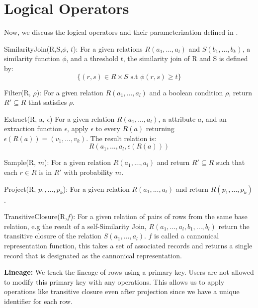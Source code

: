\section{Logical Operators}
Now, we discuss the logical operators and their parameterization defined in \projx.

\vspace{0.5em}

\noindent \textsf{SimilarityJoin(R,S,$\phi$, $t$)}: For a given relations $R(a_1,...,a_l)$ and $S(b_1,...,b_k)$, a similarity function $\phi$, and a threshold $t$, the similarity join of R and S is defined by:
\[
\{ (r,s) \in R \times S \text{ s.t } \phi (r,s) \ge t \}
\]

\vspace{0.5em}


\noindent \textsf{Filter(R, $\rho$)}: For a given relation $R(a_1,...,a_l)$ and a boolean condition $\rho$, return $R' \subseteq R$ that satisfies $\rho$.

\vspace{0.5em}

\noindent \textsf{Extract(R, a, $\epsilon$)} For a given relation $R(a_1,...,a_l)$, a attribute $a$, and an extraction function $\epsilon$, apply $\epsilon$ to every $R(a)$ returning $\epsilon(R(a)) = (v_1,...,v_k)$. The result relation is:
\[
R(a_1,...,a_l,\epsilon(R(a)))
\]

\noindent \textsf{Sample(R, $m$)}: For a given relation $R(a_1,...,a_l)$ and return $R' \subseteq R$ such that each $r \in R$ is in $R'$ with probability $m$.

\vspace{0.5em}

\noindent \textsf{Project(R, $p_1,...,p_k$)}: For a given relation $R(a_1,...,a_l)$ and return $R(p_1,...,p_k)$.

\vspace{0.5em}

\noindent \textsf{TransitiveClosure(R,$f$)}: For a given relation of pairs of rows from the same base relation, e.g the result of a self-Similarity Join, $R(a_1,...,a_l, b_1,...,b_l)$ return the transitive closure of the relation $S(a_1,...,a_l)$. $f$ is called a cannonical representation function, this takes a set of associated records and returns a single record that is designated as the cannonical representation.

\vspace{1em}

\noindent\textbf{Lineage: }
We track the lineage of rows using a primary key.
Users are not allowed to modify this primary key with any operations.
This allows us to apply operations like transitive closure even after projection since we have a unique identifier for each row.

